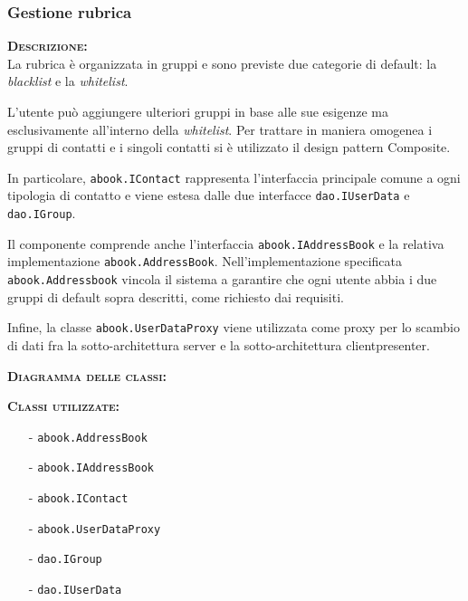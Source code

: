 \subsubsection{Gestione rubrica}
\begin{description}
	\item{\scshape\bfseries Descrizione:}\\
La rubrica è organizzata in gruppi e sono previste due categorie di default: la \textit{blacklist} e la \textit{whitelist}.

L'utente può aggiungere ulteriori gruppi in base alle sue esigenze ma esclusivamente all'interno della \textit{whitelist}. Per trattare in maniera omogenea i gruppi di contatti e i singoli contatti si è utilizzato il design pattern Composite.

In particolare, \texttt{abook.IContact} rappresenta l'interfaccia principale comune a ogni tipologia di contatto e viene estesa dalle due interfacce \texttt{dao.IUserData} e \texttt{dao.IGroup}.

Il componente comprende anche l'interfaccia \texttt{abook.IAddressBook} e la relativa implementazione \texttt{abook.AddressBook}. Nell'implementazione specificata \texttt{abook.Addressbook} vincola il sistema a garantire che ogni utente abbia i due gruppi di default sopra descritti, come richiesto dai requisiti.

Infine, la classe \texttt{abook.UserDataProxy} viene utilizzata come proxy per lo scambio di dati fra la sotto-architettura server e la sotto-architettura clientpresenter.
	\item{\scshape\bfseries Diagramma delle classi:}
	\item{\scshape\bfseries Classi utilizzate:}\\
	\begin{itemize}[nolistsep, noitemsep]
	  \item[-] \texttt{abook.AddressBook}
	  \item[-] \texttt{abook.IAddressBook}
	  \item[-] \texttt{abook.IContact}
	  \item[-] \texttt{abook.UserDataProxy}
	  \item[-] \texttt{dao.IGroup}
	  \item[-] \texttt{dao.IUserData}
	\end{itemize}
\end{description}


